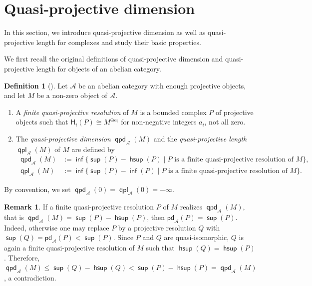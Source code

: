 \documentclass[10pt, a4paper,reqno]{amsart}
\theoremstyle{definition}
\newtheorem{dfn}[dfn]{Definition}
\newtheorem{rmk}[rmk]{Remark}
\theoremstyle{remark}
\numberwithin{equation}{thm}
\def\cA{\mathcal{A}}
\def\sH{\mathsf{H}}
\def\sup{\operatorname{\mathsf{sup}}}
\def\hsup{\operatorname{\mathsf{hsup}}}
\def\inf{\operatorname{\mathsf{inf}}}
\def\pd{\mathsf{pd}}
\def\qpd{\operatorname{\mathsf{qpd}}}
\def\qpl{\operatorname{\mathsf{qpl}}}
\begin{document}
\section{Quasi-projective dimension}
 
In this section, we introduce quasi-projective dimension as well as quasi-projective length for complexes and study their basic properties.


We first recall the original definitions of quasi-projective dimension and quasi-projective length for objects of an abelian category.

\begin{dfn}[{\cite[Definitions~3.1 and 5.1]{GJT}}]\label{defmod}
Let $\cA$ be an abelian category with enough projective objects, and let $M$ be a non-zero object of $\cA$.
\begin{enumerate}[\rm(1)]
\item 
A {\em finite quasi-projective resolution} of $M$ is a bounded complex $P$ of projective objects such that $\sH_i(P)\cong M^{\oplus a_i}$ for non-negative integers $a_i$, not all zero.

\item 
The {\em quasi-projective dimension} $\qpd_\cA(M)$ and the {\em quasi-projective length} $\qpl_\cA(M)$ of $M$ are defined by
\begin{align*}
\qpd_\cA(M)&:=\inf\{\sup(P) - \hsup(P) \mid P\text{ is a finite quasi-projective resolution of }M\},\\
\qpl_\cA(M)&:=\inf\{\sup(P) - \inf(P) \mid P\text{ is a finite quasi-projective resolution of }M\}.
\end{align*}
\end{enumerate}
By convention, we set $\qpd_\cA(0)=\qpl_\cA(0)=-\infty$.
\end{dfn}

\begin{rmk}\label{rmk:qpr-pd}
If a finite quasi-projective resolution $P$ of $M$ realizes $\qpd_\cA(M)$, that is $\qpd_\cA(M) = \sup(P) - \hsup(P)$, then $\pd_\cA(P)=\sup(P)$.
Indeed, otherwise one may replace $P$ by a projective resolution $Q$ with $\sup(Q) = \pd_\cA(P)<\sup(P)$.
Since $P$ and $Q$ are quasi-isomorphic, $Q$ is again a finite quasi-projective resolution of $M$ such that $\hsup(Q) = \hsup(P)$.
Therefore, $\qpd_\cA(M) \le \sup(Q) - \hsup(Q) < \sup(P) - \hsup(P) = \qpd_\cA(M)$, a contradiction.
\end{rmk}
\end{document}
